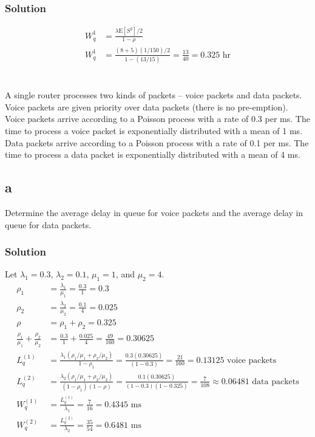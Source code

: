 \documentclass[letterpaper]{amsart}
\begin{document}
\subsubsection*{Solution}
\begin{align*}
W_q^{1}&=\frac{\lambda\text{E}[S^2]/2}{1-\rho} \\
W_q^{1}&=\frac{(8+5)(1/150)/2}{1-(13/15)}
         = \frac{13}{40} = 0.325 \text{ hr}
\end{align*}

\section{} %
A single router processes two kinds of packets – voice packets and data packets.
Voice packets are given priority over data packets (there is no pre-emption).
Voice packets arrive according to a Poisson process with a rate of 0.3 per ms.
The time to process a voice packet is exponentially distributed with a mean of 1
ms. Data packets arrive according to a Poisson process with a rate of 0.1 per
ms. The time to process a data packet is exponentially distributed with a mean
of 4 ms.
\subsection*{a}
Determine the average delay in queue for voice packets and the average
delay in queue for data packets.
\subsubsection*{Solution}
Let $\lambda_1= 0.3$, $\lambda_2=0.1$, $\mu_1=1$, and $\mu_2=4$.
\begin{align*}
  \rho_1 &=\frac{\lambda_1}{\mu_1}=\frac{0.3}{1} = 0.3 \\
  \rho_2 &=\frac{\lambda_2}{\mu_2}=\frac{0.1}{4} = 0.025 \\
  \rho &=\rho_1+\rho_2=0.325\\
  \frac{\rho_1}{\mu_1}+\frac{\rho_2}{\mu_2}&= \frac{0.3}{1}+\frac{0.025}{4}
                                             =\frac{49}{160}=0.30625\\
  L_q^{(1)}&=\frac{\lambda_1(\rho_1/\mu_1+\rho_2/\mu_2)}{1-\rho_1}
             =\frac{0.3(0.30625)}{(1-0.3)} = \frac{21}{160}=0.13125\text{ voice packets}\\
  L_q^{(2)}&=\frac{\lambda_2(\rho_1/\mu_1+\rho_2/\mu_2)}{(1-\rho_1)(1-\rho)}
             =\frac{0.1(0.30625)}{(1-0.3)(1-0.325)}
             = \frac{7}{108}\approx 0.06481\text{ data packets}\\
  W_q^{(1)}&= \frac{L_q^{(1)}}{\lambda_1}=\frac{7}{16}= 0.4345\text{ ms}\\
  W_q^{(2)}&= \frac{L_q^{(2)}}{\lambda_2}=\frac{35}{54}= 0.6481\text{ ms}
\end{align*}
\end{document}
